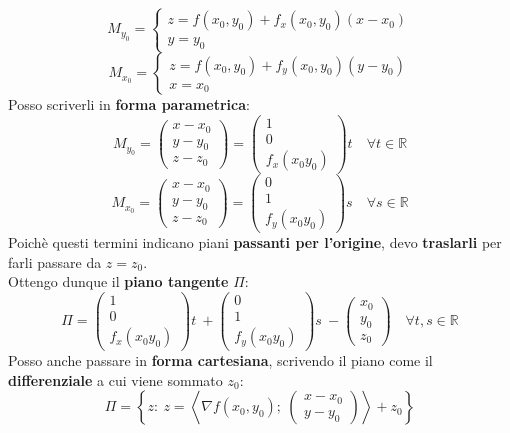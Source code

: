 \documentclass[a4paper, oneside]{article}
\newcommand\R{\mathbb{R}}
\begin{document}
    \[M_{y_0} = \begin{cases}
        z = f(x_0,y_0) + f_x(x_0,y_0)(x-x_0) \\
        y=y_0
    \end{cases}\]
    \[M_{x_0} = \begin{cases}
        z = f(x_0,y_0) + f_y(x_0,y_0)(y-y_0) \\
        x=x_0
    \end{cases}\]
    Posso scriverli in \textbf{forma parametrica}:
    \[M_{y_0} = \begin{pmatrix}
        x-x_0 \\ y-y_0 \\ z-z_0
    \end{pmatrix} = \begin{pmatrix}
        1 \\ 0 \\ f_x(x_0y_0)
    \end{pmatrix} t \quad\forall t\in\R\]
    \[M_{x_0} = \begin{pmatrix}
        x-x_0 \\ y-y_0 \\ z-z_0
    \end{pmatrix} = \begin{pmatrix}
        0 \\ 1 \\ f_y(x_0y_0)
    \end{pmatrix} s \quad\forall s\in\R\]
    Poichè questi termini indicano piani \textbf{passanti per l'origine}, devo \textbf{traslarli} per farli passare da $z=z_0$. \\
    Ottengo dunque il \textbf{piano tangente} $\Pi$:
    \[\Pi = \begin{pmatrix}
        1 \\ 0 \\ f_x(x_0y_0)
    \end{pmatrix}t \ + \begin{pmatrix}
        0 \\ 1 \\ f_y(x_0y_0)
    \end{pmatrix}s \ - \begin{pmatrix}
        x_0 \\ y_0 \\ z_0
    \end{pmatrix}\quad\forall t,s\in\R\]
    Posso anche passare in \textbf{forma cartesiana}, scrivendo il piano come il \textbf{differenziale} a cui viene sommato $z_0$:
    \[\Pi = \left\{z: \ z = \left\langle \nabla f(x_0,y_0); \ \begin{pmatrix}
        x-x_0 \\ y-y_0
    \end{pmatrix}\right\rangle + z_0\right\}\]
\end{document}
